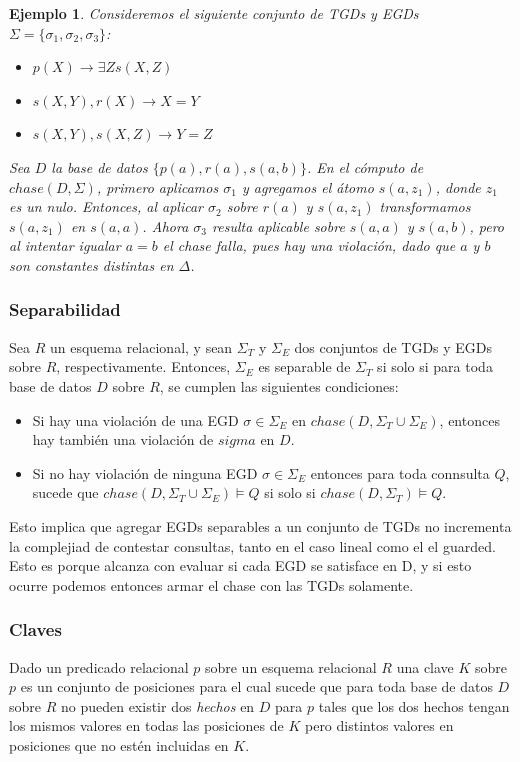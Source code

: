 \documentclass[11pt,a4paper,twoside]{tesis}
\newtheorem{exmp}{Ejemplo}
\begin{document}
\begin{exmp}
Consideremos el siguiente conjunto de TGDs y EGDs $\Sigma = \{\sigma_1, \sigma_2, \sigma_3\}$:

\begin{itemize}
    \item [$\sigma_1:$] $p(X) \rightarrow \exists Z s(X, Z)$
    \item [$\sigma_2:$] $s(X, Y), r(X)  \rightarrow X = Y$
    \item [$\sigma_3:$] $s(X, Y), s(X, Z) \rightarrow Y = Z$
\end{itemize}

Sea $D$ la base de datos $\{p(a), r(a), s(a, b)\}$. En el cómputo de $chase(D, \Sigma)$, primero aplicamos $\sigma_1$ y agregamos el átomo $s(a, z_1)$, donde $z_1$ es un nulo. Entonces, al aplicar $\sigma_2$ sobre $r(a)$ y $s(a, z_1)$ transformamos $s(a, z_1)$ en $s(a, a)$. Ahora $\sigma_3$ resulta aplicable sobre $s(a, a)$ y $s(a, b)$, pero al intentar igualar $a = b$ el \textit{chase} falla, pues hay una violación, dado que $a$ y $b$ son constantes distintas en $\Delta$.
\end{exmp}

\subsubsection{Separabilidad}
Sea $R$ un esquema relacional, y sean $\Sigma_T$ y $\Sigma_E$ dos conjuntos de TGDs y EGDs sobre $R$, respectivamente. Entonces, $\Sigma_E$ es separable de $\Sigma_T$ si solo si para toda base de datos $D$ sobre $R$, se cumplen las siguientes condiciones: 
\begin{itemize}
    \item  Si hay una violación de una EGD $\sigma \in \Sigma_E$ en $chase(D, \Sigma_T \cup \Sigma_E)$, entonces hay también una violación de $sigma$ en $D$.
    \item Si no hay violación de ninguna EGD $\sigma \in \Sigma_E$ entonces para toda connsulta $Q$, sucede que $chase(D, \Sigma_T \cup \Sigma_E) \models Q$ si solo si $chase(D, \Sigma_T) \models Q$.
\end{itemize}

Esto implica que agregar EGDs separables a un conjunto de TGDs no incrementa la complejiad de contestar consultas, tanto en el caso lineal como el el guarded. Esto es porque alcanza con evaluar si cada EGD se satisface en D, y si esto ocurre podemos entonces armar el chase con las TGDs solamente.

\subsubsection{Claves}
Dado un predicado relacional $p$ sobre un esquema relacional $R$ una clave $K$ sobre $p$ es un conjunto de posiciones para el cual sucede que para toda base de datos $D$ sobre $R$ no pueden existir dos \textit{hechos} en $D$ para $p$ tales que los dos hechos tengan los mismos valores en todas las posiciones de $K$ pero distintos valores en posiciones que no estén incluidas en $K$. 
\end{document}
